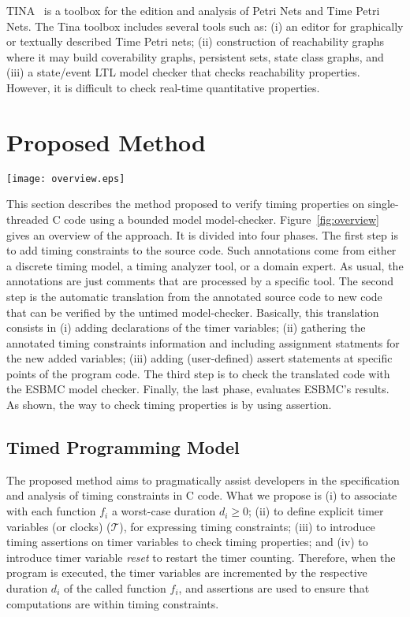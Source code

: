 \documentclass{llncs}
\begin{document}
TINA~\cite{Tina06} is a toolbox for the edition and analysis of Petri Nets and Time Petri Nets. 
The Tina toolbox includes several tools such as: (i) an editor for graphically or textually described 
Time Petri nets; (ii) construction of reachability graphs where it may build coverability graphs, 
persistent sets, state class graphs, and (iii) a state/event LTL model checker that checks reachability properties.
However, it is difficult to check real-time quantitative properties.


\section {Proposed Method}

\begin{figure*}[!t]
	\centering
	\texttt{[image: overview.eps]}
	\caption{Overview of the Proposed Method}
	\label{fig:overview}
\end{figure*} 

This section describes the method proposed to verify timing properties on single-threaded 
C code using a bounded model model-checker.
Figure~\ref{fig:overview} gives an overview of the approach. 
It is divided into four phases. The first step is to add timing constraints to the source code. 
Such annotations come from either a discrete timing model, a timing analyzer tool, or a domain expert.
As usual, the annotations are just comments that are processed by a specific tool. 
The second step is the automatic translation from the annotated source code to new code that can be verified by the untimed model-checker. 
Basically, this translation consists in (i) adding declarations of the timer variables; (ii) gathering the annotated timing constraints 
information and including assignment statments for the new added variables; (iii) adding (user-defined) assert statements at 
specific points of the program code. 
The third step is to check the translated code with the ESBMC model checker. 
Finally, the last phase, evaluates ESBMC's results.
As shown, the way to check timing properties is by using assertion.


\subsection{Timed Programming Model}
\label{section:overview}


The proposed method aims to pragmatically assist developers in the specification and analysis of timing constraints 
in C code.
What we propose is 
(i) to associate with each function $f_i$ a worst-case duration $d_i \geq 0$; 
(ii) to define explicit timer variables (or clocks) ($\mathcal{T}$), 
for expressing timing constraints; 
(iii) to introduce timing assertions on timer variables to check timing properties; and
(iv) to introduce  timer variable {\it reset} to restart the timer counting.
Therefore, when the program is executed, the timer variables are incremented by the respective 
duration $d_i$ of the called function $f_i$, and
assertions are used to ensure that computations are within timing constraints. 
\end{document}
